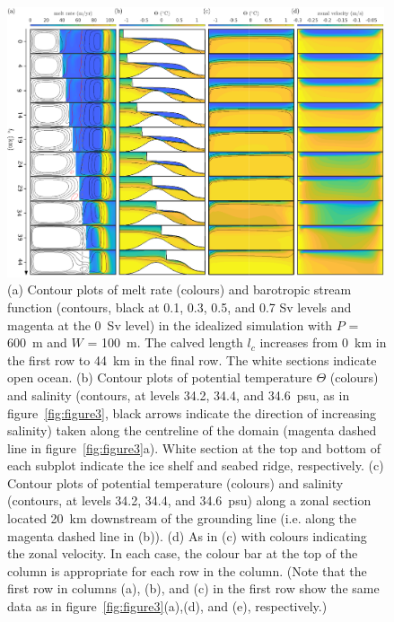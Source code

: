 \documentclass[draft]{agujournal2019}
\begin{document}
\begin{figure}
    \centering
    \includegraphics[width = 0.99\textwidth]{../make_figures/plots/figure5_axislabel.pdf}
    \caption{(a) Contour plots of melt rate (colours) and barotropic stream function (contours, black at 0.1, 0.3, 0.5, and 0.7 Sv levels and magenta at the 0~Sv level) in the idealized simulation with $P$ = 600~m and $W$ = 100~m. The calved length $l_c$ increases from 0~km in the first row to 44~km in the final row. The white sections indicate open ocean. (b) Contour plots of potential temperature $\Theta$ (colours) and salinity (contours, at levels 34.2, 34.4, and 34.6~psu, as in figure~\ref{fig:figure3}, black arrows indicate the direction of increasing salinity) taken along the centreline of the domain (magenta dashed line in figure~\ref{fig:figure3}a). White section at the top and bottom of each subplot indicate the ice shelf and seabed ridge, respectively. (c) Contour plots of potential temperature (colours) and salinity (contours, at levels 34.2, 34.4, and 34.6~psu) along a zonal section located 20~km downstream of the grounding line (i.e. along the magenta dashed line in (b)). (d) As in (c) with colours indicating the zonal velocity.  In each case, the colour bar at the top of the column is appropriate for each row in the column. (Note that the first row in columns (a), (b), and (c) in the first row show the same data as in figure~\ref{fig:figure3}(a),(d), and (e), respectively.) }
    \label{fig:figure5}
\end{figure}
\end{document}
